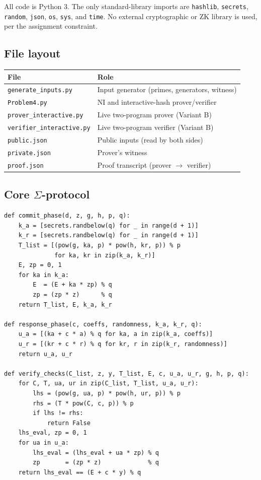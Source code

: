 \documentclass[11pt,a4paper]{article}
\begin{document}
All code is Python 3. The only standard-library imports are
\texttt{hashlib}, \texttt{secrets}, \texttt{random}, \texttt{json},
\texttt{os}, \texttt{sys}, and \texttt{time}. No external cryptographic
or ZK library is used, per the assignment constraint.

\subsection{File layout}

\begin{center}
\begin{tabular}{ll}
\toprule
\textbf{File} & \textbf{Role} \\
\midrule
\texttt{generate\_inputs.py}   & Input generator (primes, generators, witness)\\
\texttt{Problem4.py}           & NI and interactive-hash prover/verifier\\
\texttt{prover\_interactive.py}    & Live two-program prover (Variant B)\\
\texttt{verifier\_interactive.py}  & Live two-program verifier (Variant B)\\
\texttt{public.json}           & Public inputs (read by both sides)\\
\texttt{private.json}          & Prover's witness\\
\texttt{proof.json}            & Proof transcript (prover $\to$ verifier)\\
\bottomrule
\end{tabular}
\end{center}

\subsection{Core $\Sigma$-protocol}

\begin{lstlisting}[style=pythonstyle, caption={Commit, response, and verification.}]
def commit_phase(d, z, g, h, p, q):
    k_a = [secrets.randbelow(q) for _ in range(d + 1)]
    k_r = [secrets.randbelow(q) for _ in range(d + 1)]
    T_list = [(pow(g, ka, p) * pow(h, kr, p)) % p
              for ka, kr in zip(k_a, k_r)]
    E, zp = 0, 1
    for ka in k_a:
        E  = (E + ka * zp) % q
        zp = (zp * z)      % q
    return T_list, E, k_a, k_r

def response_phase(c, coeffs, randomness, k_a, k_r, q):
    u_a = [(ka + c * a) % q for ka, a in zip(k_a, coeffs)]
    u_r = [(kr + c * r) % q for kr, r in zip(k_r, randomness)]
    return u_a, u_r

def verify_checks(C_list, z, y, T_list, E, c, u_a, u_r, g, h, p, q):
    for C, T, ua, ur in zip(C_list, T_list, u_a, u_r):
        lhs = (pow(g, ua, p) * pow(h, ur, p)) % p
        rhs = (T * pow(C, c, p)) % p
        if lhs != rhs:
            return False
    lhs_eval, zp = 0, 1
    for ua in u_a:
        lhs_eval = (lhs_eval + ua * zp) % q
        zp       = (zp * z)             % q
    return lhs_eval == (E + c * y) % q
\end{lstlisting}
\end{document}
